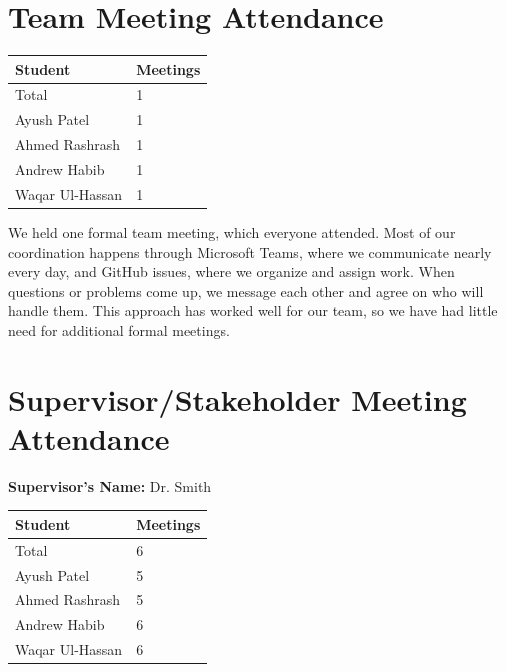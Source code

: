 \documentclass{article}
\begin{document}
\section{Team Meeting Attendance}


\begin{table}[H]
\centering
\begin{tabular}{ll}
\toprule
\textbf{Student} & \textbf{Meetings}\\
\midrule
Total & 1\\
Ayush Patel & 1\\
Ahmed Rashrash & 1\\
Andrew Habib & 1\\
Waqar Ul-Hassan & 1\\
\bottomrule
\end{tabular}
\end{table}

We held one formal team meeting, which everyone attended. Most of our coordination happens through Microsoft Teams, where we communicate nearly every day, and GitHub issues, where we organize and assign work. When questions or problems come up, we message each other and agree on who will handle them. This approach has worked well for our team, so we have had little need for additional formal meetings.

\section{Supervisor/Stakeholder Meeting Attendance}


\noindent \textbf{Supervisor's Name: } Dr. Smith

\begin{table}[H]
\centering
\begin{tabular}{ll}
\toprule
\textbf{Student} & \textbf{Meetings}\\
\midrule
Total & 6\\
Ayush Patel & 5\\
Ahmed Rashrash & 5\\
Andrew Habib & 6\\
Waqar Ul-Hassan & 6\\
\bottomrule
\end{tabular}
\end{table}
\end{document}
